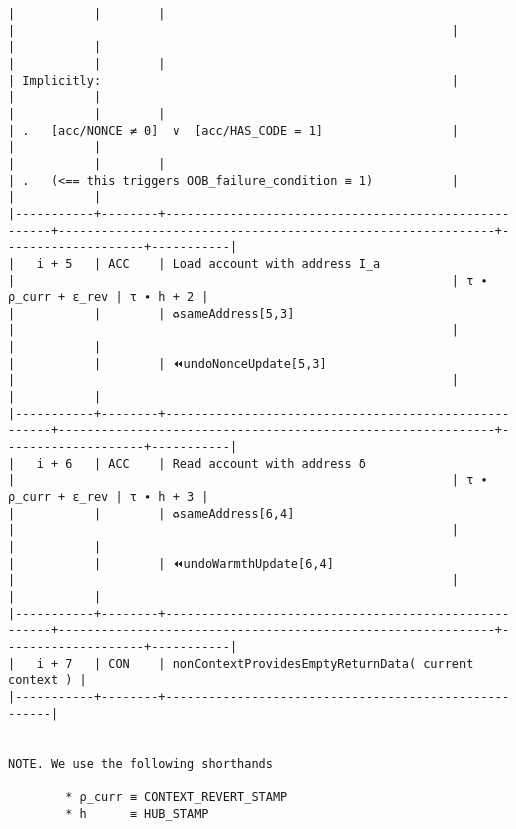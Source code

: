 \documentclass[varwidth=\maxdimen,margin=0.5cm,multi={verbatim}]{standalone}
\begin{document}
\begin{verbatim}
|           |        |                                                      |                                                             |                    |           |
|           |        |                                                      | Implicitly:                                                 |                    |           |
|           |        |                                                      | .   [acc/NONCE ≠ 0]  ∨  [acc/HAS_CODE = 1]                  |                    |           |
|           |        |                                                      | .   (<== this triggers OOB_failure_condition ≡ 1)           |                    |           |
|-----------+--------+------------------------------------------------------+-------------------------------------------------------------+--------------------+-----------|
|   i + 5   | ACC    | Load account with address I_a                        |                                                             | τ ∙ ρ_curr + ε_rev | τ ∙ h + 2 |
|           |        | ♻️sameAddress[5,3]                                   |                                                             |                    |           |
|           |        | ⏪undoNonceUpdate[5,3]                               |                                                             |                    |           |
|-----------+--------+------------------------------------------------------+-------------------------------------------------------------+--------------------+-----------|
|   i + 6   | ACC    | Read account with address δ                          |                                                             | τ ∙ ρ_curr + ε_rev | τ ∙ h + 3 |
|           |        | ♻️sameAddress[6,4]                                   |                                                             |                    |           |
|           |        | ⏪undoWarmthUpdate[6,4]                              |                                                             |                    |           |
|-----------+--------+------------------------------------------------------+-------------------------------------------------------------+--------------------+-----------|
|   i + 7   | CON    | nonContextProvidesEmptyReturnData( current context ) |
|-----------+--------+------------------------------------------------------|


NOTE. We use the following shorthands

        * ρ_curr ≡ CONTEXT_REVERT_STAMP
        * h      ≡ HUB_STAMP

\end{verbatim}
\end{document}
